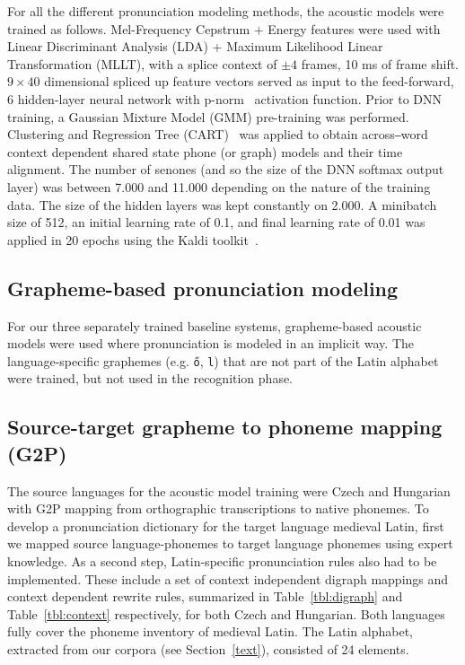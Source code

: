 \documentclass[runningheads,a4paper]{llncs}
\begin{document}
For all the different pronunciation modeling methods, the acoustic models were trained as follows.
Mel-Frequency Cepstrum $+$ Energy features were used with Linear Discriminant Analysis (LDA) + Maximum Likelihood Linear Transformation (MLLT), with a splice context of $\pm4$ frames, 10 ms of frame shift.
$9\times40$ dimensional spliced up feature vectors served as input to the feed-forward, 6 hidden-layer neural network with p-norm~\cite{kaldi} activation function.
Prior to DNN training, a Gaussian Mixture Model (GMM) pre-training was performed.
Clustering and Regression Tree (CART)~\cite{kaldi} was applied to obtain across‒word context dependent shared state phone (or graph) models and their time alignment.
The number of senones (and so the size of the DNN softmax output layer) was between 7.000 and 11.000 depending on the nature of the training data.
The size of the hidden layers was kept constantly on 2.000.
A minibatch size of 512, an initial learning rate of 0.1, and final learning rate of 0.01 was applied in 20 epochs using the Kaldi toolkit~\cite{kaldi}.

\subsection{Grapheme-based pronunciation modeling}\label{baseline}
For our three separately trained baseline systems, grapheme-based acoustic models were used where pronunciation is modeled in an implicit way.
The language-specific graphemes (e.g. \texttt{\H{o}}, \texttt{l{}}) that are not part of the Latin alphabet were trained, but not used in the recognition phase.

\subsection{Source-target grapheme to phoneme mapping (G2P)}\label{g2p}
The source languages for the acoustic model training were Czech and Hungarian with G2P mapping from orthographic transcriptions to native phonemes.
To develop a pronunciation dictionary for the target language medieval Latin, first we mapped source language-phonemes to target language phonemes using expert knowledge.
As a second step, Latin-specific pronunciation rules also had to be implemented.
These include a set of context independent digraph mappings and context dependent rewrite rules, summarized in Table~\ref{tbl:digraph} and Table~\ref{tbl:context} respectively, for both Czech and Hungarian.
Both languages fully cover the phoneme inventory of medieval Latin.
The Latin alphabet, extracted from our corpora (see Section~\ref{text}), consisted of 24 elements.
\end{document}
